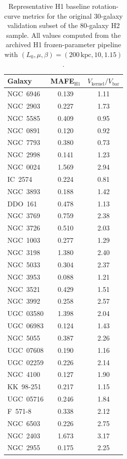 \documentclass{aa}
\begin{document}
\begin{table}[p]
	\caption{Representative H1 baseline rotation-curve metrics for the original 30-galaxy validation subset of the 80-galaxy H2 sample. All values computed from the archived H1 frozen-parameter pipeline with $(L_0, \mu, \beta) = (200\,\mathrm{kpc}, 10, 1.15)$.}
	\label{tab:h1_baseline}
	\centering
	\small
	\begin{tabular}{lcc}
		\hline\hline
		Galaxy & MAFE$_{\mathrm{H1}}$ & $V_{\mathrm{kernel}}/V_{\mathrm{bar}}$ \\
		\hline
		NGC~6946  & 0.139 & 1.11 \\
		NGC~2903  & 0.227 & 1.73 \\
		NGC~5585  & 0.409 & 0.95 \\
		NGC~0891  & 0.120 & 0.92 \\
		NGC~7793  & 0.380 & 0.73 \\
		NGC~2998  & 0.141 & 1.23 \\
		NGC~0024  & 1.569 & 2.94 \\
		IC~2574   & 0.224 & 0.81 \\
		NGC~3893  & 0.188 & 1.42 \\
		DDO~161   & 0.478 & 1.13 \\
		NGC~3769  & 0.759 & 2.38 \\
		NGC~3726  & 0.510 & 2.03 \\
		NGC~1003  & 0.277 & 1.29 \\
		NGC~3198  & 1.380 & 2.40 \\
		NGC~5033  & 0.304 & 2.37 \\
		NGC~3953  & 0.088 & 1.21 \\
		NGC~3521  & 0.429 & 1.51 \\
		NGC~3992  & 0.258 & 2.57 \\
		UGC~03580 & 1.398 & 2.04 \\
		UGC~06983 & 0.124 & 1.43 \\
		NGC~5055  & 0.387 & 2.26 \\
		UGC~07608 & 0.190 & 1.16 \\
		UGC~02259 & 0.226 & 2.14 \\
		NGC~4100  & 0.127 & 1.90 \\
		KK~98-251 & 0.217 & 1.15 \\
		UGC~05716 & 0.246 & 1.84 \\
		F~571-8   & 0.338 & 2.12 \\
		NGC~6503  & 0.226 & 2.75 \\
		NGC~2403  & 1.673 & 3.17 \\
		NGC~2955  & 0.175 & 2.25 \\
		\hline
	\end{tabular}
\end{table}
\end{document}
